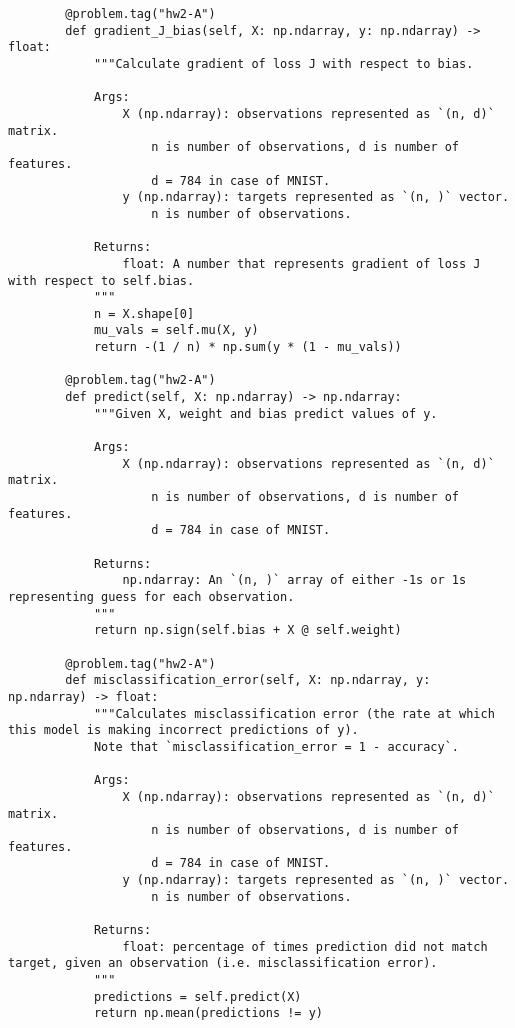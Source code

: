 \documentclass{article}
\begin{document}
\begin{lstlisting}
        @problem.tag("hw2-A")
        def gradient_J_bias(self, X: np.ndarray, y: np.ndarray) -> float:
            """Calculate gradient of loss J with respect to bias.
    
            Args:
                X (np.ndarray): observations represented as `(n, d)` matrix.
                    n is number of observations, d is number of features.
                    d = 784 in case of MNIST.
                y (np.ndarray): targets represented as `(n, )` vector.
                    n is number of observations.
    
            Returns:
                float: A number that represents gradient of loss J with respect to self.bias.
            """
            n = X.shape[0]
            mu_vals = self.mu(X, y)
            return -(1 / n) * np.sum(y * (1 - mu_vals)) 
    
        @problem.tag("hw2-A")
        def predict(self, X: np.ndarray) -> np.ndarray:
            """Given X, weight and bias predict values of y.
    
            Args:
                X (np.ndarray): observations represented as `(n, d)` matrix.
                    n is number of observations, d is number of features.
                    d = 784 in case of MNIST.
    
            Returns:
                np.ndarray: An `(n, )` array of either -1s or 1s representing guess for each observation.
            """
            return np.sign(self.bias + X @ self.weight)
    
        @problem.tag("hw2-A")
        def misclassification_error(self, X: np.ndarray, y: np.ndarray) -> float:
            """Calculates misclassification error (the rate at which this model is making incorrect predictions of y).
            Note that `misclassification_error = 1 - accuracy`.
    
            Args:
                X (np.ndarray): observations represented as `(n, d)` matrix.
                    n is number of observations, d is number of features.
                    d = 784 in case of MNIST.
                y (np.ndarray): targets represented as `(n, )` vector.
                    n is number of observations.
    
            Returns:
                float: percentage of times prediction did not match target, given an observation (i.e. misclassification error).
            """
            predictions = self.predict(X)
            return np.mean(predictions != y)
    

\end{lstlisting}
\end{document}
